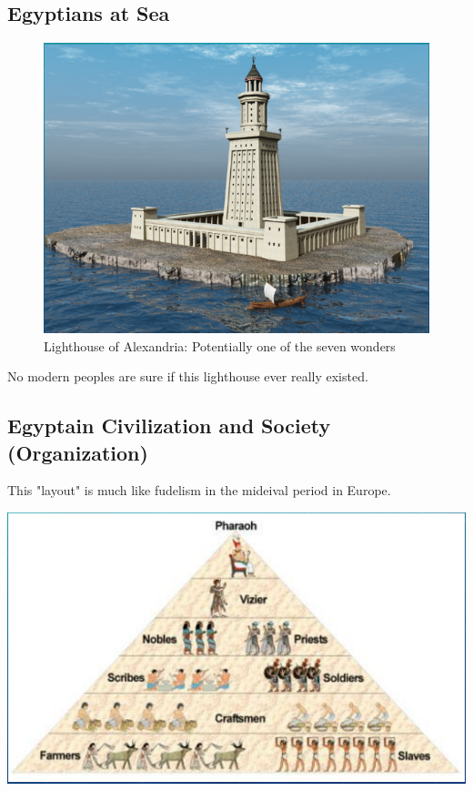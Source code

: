 \documentclass[11pt]{article}
\begin{document}
\subsection{Egyptians at Sea}
\label{sec-4-6}
\begin{figure}[htb]
\centering
\includegraphics[width=.9\linewidth]{img/7wonderLight.png}
\caption{Lighthouse of Alexandria: Potentially one of the seven wonders}
\end{figure}
No modern peoples are sure if this lighthouse ever really existed.

\subsection{Egyptain Civilization and Society (Organization)}
\label{sec-4-7}
This "layout" is much like fudelism in the mideival period in Europe.

\includegraphics[width=.9\linewidth]{img/egyptSoc.png}
\end{document}
